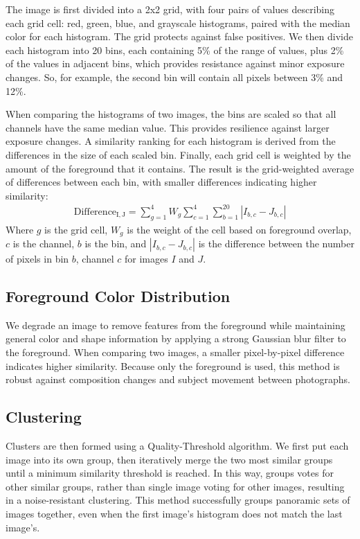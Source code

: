 \documentclass{sig-alternate}
\begin{document}
The image is first divided into a 2x2 grid, with four pairs of values describing each grid cell: red, green, blue, and grayscale histograms, paired with the median color for each histogram. The grid protects against false positives. We then divide each histogram into 20 bins, each containing 5\% of the range of values, plus 2\% of the values in adjacent bins, which provides resistance against minor exposure changes. So, for example, the second bin will contain all pixels between 3\% and 12\%.

When comparing the histograms of two images, the bins are scaled so that all channels have the same median value. This provides resilience against larger exposure changes. A similarity ranking for each histogram is derived from the differences in the size of each scaled bin. Finally, each grid cell is weighted by the amount of the foreground that it contains. The result is the grid-weighted average of differences between each bin, with smaller differences indicating higher similarity:
\begin{eqnarray}
\mathrm{Difference_{I,J}}=\displaystyle\sum\limits_{g=1}^4W_g\sum\limits_{c=1}^4\sum\limits_{b=1}^{20} |I_{b,c} - J_{b,c}|
\end{eqnarray}
Where \(g\) is the grid cell, \(W_g\) is the weight of the cell based on foreground overlap, \(c\) is the channel, \(b\) is the bin, and \(|I_{b,c}-J_{b,c}|\) is the difference between the number of pixels in bin \(b\), channel \(c\) for images \(I\) and \(J\).

\subsection{Foreground Color Distribution}
We degrade an image to remove features from the foreground while maintaining general color and shape information by applying a strong Gaussian blur filter to the foreground. When comparing two images, a smaller pixel-by-pixel difference indicates higher similarity. Because only the foreground is used, this method is robust against composition changes and subject movement between photographs.

\subsection{Clustering}
Clusters are then formed using a Quality-Threshold algorithm. We first put each image into its own group, then iteratively merge the two most similar groups until a minimum similarity threshold is reached. In this way, groups votes for other similar groups, rather than single image voting for other images, resulting in a noise-resistant clustering. This method successfully groups panoramic sets of images together, even when the first image's histogram does not match the last image's. %
\end{document}
